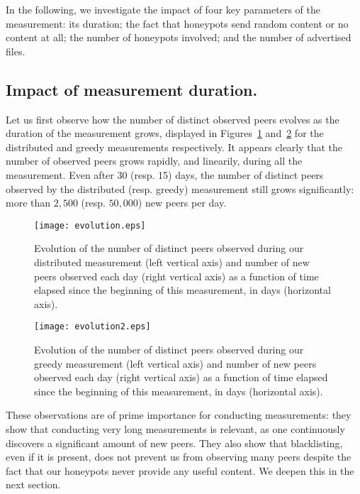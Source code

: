 \documentclass[final,
notitlepage,
narroweqnarray,
	inline,
	twoside,
]{ieee}
\begin{document}
In the following, we investigate the impact of four key parameters of
the measurement: its duration; the fact that honeypots send random
content or no content at all; the number of honeypots involved; and
the number of advertised files.

\subsection{Impact of measurement duration.}
\label{sec-duration}

Let us first observe how the number of distinct observed peers evolves as the duration of the measurement grows, displayed in Figures~\ref{fig-nbpeers-distributed} and~\ref{fig-nbpeers-greedy} for the distributed and greedy measurements respectively. It appears clearly that the number of observed peers grows rapidly, and linearily, during all the measurement. Even after 30 (resp. 15) days, the number of distinct peers observed by the distributed (resp. greedy) measurement still grows significantly: more than $2,500$ (resp. $50,000$) new peers per day.

\begin{figure}[h!]
\centering
\texttt{[image: evolution.eps]}
\caption{Evolution of the number of distinct peers observed during our distributed measurement (left vertical axis) and number of new peers observed each day (right vertical axis) as a function of time elapsed since the beginning of this measurement, in days (horizontal axis).}
\label{fig-nbpeers-distributed}
\end{figure}

\begin{figure}[h!]
\centering
\texttt{[image: evolution2.eps]}
\caption{Evolution of the number of distinct peers observed during our greedy measurement (left vertical axis) and number of new peers observed each day (right vertical axis) as a function of time elapsed since the beginning of this measurement, in days (horizontal axis).}
\label{fig-nbpeers-greedy}
\end{figure}

These observations are of prime importance for conducting measurements: they show that conducting very long measurements is relevant, as one continuously discovers a significant amount of new peers. They also show that blacklisting, even if it is present, does not prevent us from observing many peers despite the fact that our honeypots never provide any useful content. We deepen this in the next section.
\end{document}

